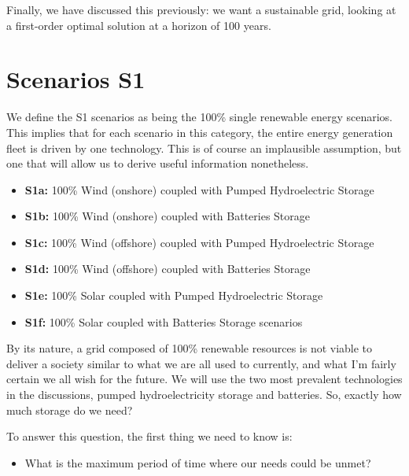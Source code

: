 Finally, we have discussed this previously: we want a sustainable grid, looking at a first-order optimal solution at a horizon of 100 years.

\section{Scenarios S1}

We define the S1 scenarios as being the 100\% single renewable energy scenarios. This implies that for each scenario in this category, the entire energy generation fleet is driven by one technology. This is of course an implausible assumption, but one that will allow us to derive useful information nonetheless.

\begin{kaobox}[frametitle=S1 scenarios]
\begin{itemize}
	\item \textbf{S1a:} 100\% Wind (onshore) coupled with Pumped Hydroelectric Storage
	\item \textbf{S1b:} 100\% Wind (onshore) coupled with Batteries Storage
	\item \textbf{S1c:} 100\% Wind (offshore) coupled with Pumped Hydroelectric Storage
	\item \textbf{S1d:} 100\% Wind (offshore) coupled with Batteries Storage
	\item \textbf{S1e:} 100\% Solar coupled with Pumped Hydroelectric Storage
	\item \textbf{S1f:} 100\% Solar coupled with Batteries Storage scenarios
\end{itemize}
\end{kaobox}

By its nature, a grid composed of 100\% renewable resources is not viable to deliver a society similar to what we are all used to currently, and what I'm fairly certain we all wish for the future. We will use the two most prevalent technologies in the discussions, pumped hydroelectricity storage and batteries. So, exactly how much storage do we need?

To answer this question, the first thing we need to know is:

\begin{itemize}
\item What is the maximum period of time where our needs could be unmet?
\end{itemize}

